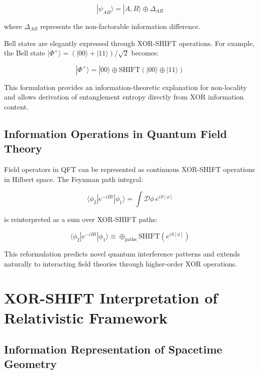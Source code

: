 \documentclass[aps,prl,preprint,superscriptaddress,showpacs]{revtex4-2}
\newcommand{\xor}{\oplus}
\newcommand{\shift}{\text{SHIFT}}
\begin{document}
\begin{equation}
|\psi_{AB}\rangle = |A,B\rangle \xor \Delta_{AB}
\end{equation}

where $\Delta_{AB}$ represents the non-factorable information difference.

Bell states are elegantly expressed through XOR-SHIFT operations. For example, the Bell state $|\Phi^+\rangle = (|00\rangle+|11\rangle)/\sqrt{2}$ becomes:

\begin{equation}
|\Phi^+\rangle = |00\rangle \xor \shift(|00\rangle \xor |11\rangle)
\end{equation}

This formulation provides an information-theoretic explanation for non-locality and allows derivation of entanglement entropy directly from XOR information content.

\subsection{Information Operations in Quantum Field Theory}

Field operators in QFT can be represented as continuous XOR-SHIFT operations in Hilbert space. The Feynman path integral:

\begin{equation}
\langle\phi_2|e^{-iHt}|\phi_1\rangle = \int \mathcal{D}\phi \, e^{iS[\phi]}
\end{equation}

is reinterpreted as a sum over XOR-SHIFT paths:

\begin{equation}
\langle\phi_2|e^{-iHt}|\phi_1\rangle \equiv \xor_{\text{paths}} \shift(e^{iS[\phi]})
\end{equation}

This reformulation predicts novel quantum interference patterns and extends naturally to interacting field theories through higher-order XOR operations.

\section{XOR-SHIFT Interpretation of Relativistic Framework}

\subsection{Information Representation of Spacetime Geometry}
\end{document}

